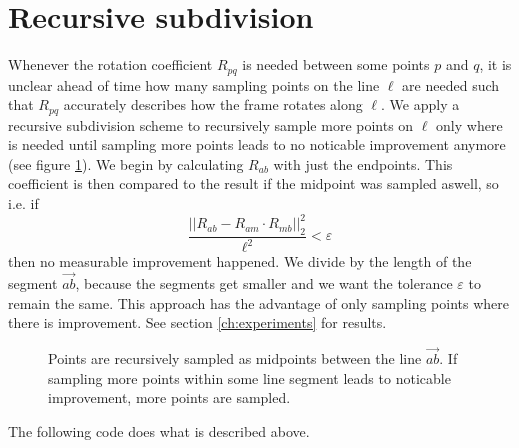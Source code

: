 \documentclass[../thesis.tex]{subfiles}
\begin{document}
\section{Recursive subdivision}
Whenever the rotation coefficient $R_{pq}$ is needed between some points $p$ and $q$,
it is unclear ahead of time how many sampling points on the line $\ell$
are needed such that $R_{pq}$ accurately describes how the frame rotates along $\ell$.
We apply a recursive subdivision scheme to recursively sample more points on $\ell$ only where is needed
until sampling more points leads to no noticable improvement anymore (see figure \ref{fig:recursiveSubdivision}).
We begin by calculating $R_{ab}$ with just the endpoints. This coefficient is then compared to the result if the midpoint was sampled aswell,
so i.e. if
$$\frac{||R_{ab} - R_{am}\cdot R_{mb}||^2_2}{\ell^2}< \varepsilon$$
then no measurable improvement happened. We divide by the length of the segment $\vec{ab}$, because the segments get smaller
and we want the tolerance $\varepsilon$ to remain the same.
This approach has the advantage of only sampling points where there is improvement.
See section \ref{ch:experiments} for results.
\begin{figure}[htb]
  \centering
  \def\svgwidth{20em}
  
  \caption{Points are recursively sampled as midpoints between the line $\vec{ab}$.
  If sampling more points within some line segment leads to noticable improvement, more points are sampled.}
  \label{fig:recursiveSubdivision}
\end{figure}

The following code does what is described above.
\end{document}
